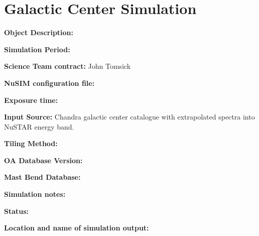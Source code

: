 
\newpage

\section{Galactic Center Simulation}

\textbf{Object Description:}

\textbf{Simulation Period:} %

\textbf{Science Team contract:} John Tomsick

\textbf{NuSIM configuration file:}

\textbf{Exposure time:}

\textbf{Input Source:} Chandra galactic center catalogue with extrapolated spectra into NuSTAR energy band.

\textbf{Tiling Method:}

\textbf{OA Database Version:} %

\textbf{Mast Bend Database:} %

\textbf{Simulation notes:} %

\textbf{Status:} %

\textbf{Location and name of simulation output:}


